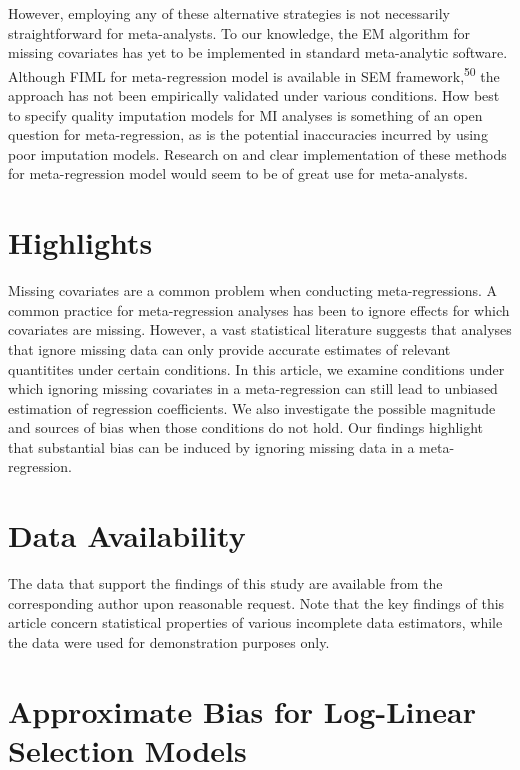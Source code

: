 \documentclass[
]{article}
\begin{document}
However, employing any of these alternative strategies is not necessarily straightforward for meta-analysts.
To our knowledge, the EM algorithm for missing covariates has yet to be implemented in standard meta-analytic software.
Although FIML for meta-regression model is available in SEM framework,\textsuperscript{50} the approach has not been empirically validated under various conditions.
How best to specify quality imputation models for MI analyses is something of an open question for meta-regression, as is the potential inaccuracies incurred by using poor imputation models.
Research on and clear implementation of these methods for meta-regression model would seem to be of great use for meta-analysts.

\clearpage

\hypertarget{highlights}{%
\section{Highlights}\label{highlights}}

Missing covariates are a common problem when conducting meta-regressions.
A common practice for meta-regression analyses has been to ignore effects for which covariates are missing.
However, a vast statistical literature suggests that analyses that ignore missing data can only provide accurate estimates of relevant quantitites under certain conditions.
In this article, we examine conditions under which ignoring missing covariates in a meta-regression can still lead to unbiased estimation of regression coefficients.
We also investigate the possible magnitude and sources of bias when those conditions do not hold.
Our findings highlight that substantial bias can be induced by ignoring missing data in a meta-regression.

\hypertarget{data-availability}{%
\section{Data Availability}\label{data-availability}}

The data that support the findings of this study are available from the corresponding author upon reasonable request. Note that the key findings of this article concern statistical properties of various incomplete data estimators, while the data were used for demonstration purposes only.

\clearpage

\appendix

\hypertarget{approximate-bias-for-log-linear-selection-models-1}{%
\section{Approximate Bias for Log-Linear Selection Models}\label{approximate-bias-for-log-linear-selection-models-1}}
\end{document}
